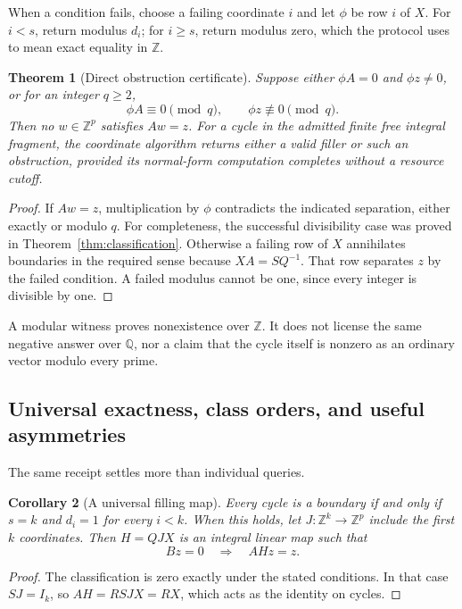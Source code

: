 \documentclass[11pt,letterpaper]{article}
\newtheorem{theorem}{Theorem}[section]
\newtheorem{corollary}[theorem]{Corollary}
\theoremstyle{definition}\newtheorem{definition}[theorem]{Definition}
\theoremstyle{remark}\newtheorem{remark}[theorem]{Remark}
\newcommand{\Z}{\mathbb Z}\newcommand{\Q}{\mathbb Q}
\begin{document}
When a condition fails, choose a failing coordinate $i$ and let $\phi$ be row
$i$ of $X$. For $i<s$, return modulus $d_i$; for $i\geq s$, return modulus zero,
which the protocol uses to mean exact equality in $\Z$.

\begin{theorem}[Direct obstruction certificate]\label{thm:obstruction}
Suppose either $\phi A=0$ and $\phi z\ne0$, or for an integer $q\geq2$,
\[
 \phi A\equiv0\pmod q,\qquad \phi z\not\equiv0\pmod q.
\]
Then no $w\in\Z^p$ satisfies $Aw=z$.
For a cycle in the admitted finite free integral fragment, the coordinate
algorithm returns either a valid filler or such an obstruction, provided its
normal-form computation completes without a resource cutoff.
\end{theorem}
\begin{proof}
If $Aw=z$, multiplication by $\phi$ contradicts the indicated separation,
either exactly or modulo $q$. For completeness, the successful divisibility
case was proved in Theorem~\ref{thm:classification}. Otherwise a failing row of
$X$ annihilates boundaries in the required sense because $XA=SQ^{-1}$.
That row separates $z$ by the failed condition. A failed modulus cannot be one,
since every integer is divisible by one.
\end{proof}

A modular witness proves nonexistence over $\Z$. It does not license the same
negative answer over $\Q$, nor a claim that the cycle itself is nonzero as an
ordinary vector modulo every prime.

\subsection{Universal exactness, class orders, and useful asymmetries}
The same receipt settles more than individual queries.

\begin{corollary}[A universal filling map]\label{cor:universal}
Every cycle is a boundary if and only if $s=k$ and $d_i=1$ for every $i<k$.
When this holds, let $J:\Z^k\to\Z^p$ include the first $k$ coordinates. Then
$H=QJX$ is an integral linear map such that
\[
 Bz=0\quad\Longrightarrow\quad AHz=z.
\]
\end{corollary}
\begin{proof}
The classification is zero exactly under the stated conditions. In that case
$SJ=I_k$, so $AH=RSJX=RX$, which acts as the identity on cycles.
\end{proof}
\end{document}
